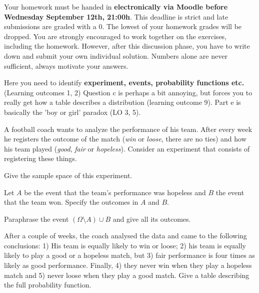 \documentclass[a4paper,10pt,landscape,twocolumn]{scrartcl}
\newcommand\deadline{Wednesday September 12th, 21:00h}
\begin{document}
\homeworkproblems

{\sffamily\noindent
Your homework must be handed in \textbf{electronically via Moodle before \deadline}. This deadline is strict and late submissions are graded with a 0. The lowest of your homework grades will be dropped. You are strongly encouraged to work together on the exercises, including the homework. However, after this discussion phase, you have to write down and submit your own individual solution. Numbers alone are never sufficient, always motivate your answers.
}



\begin{exercise}[Hospitals (4pt)]
	\begin{mycomment}
	Here you need to identify \textbf{experiment, events, probability functions etc.} (Learning outcomes 1, 2) Question c is perhaps a bit annoying, but forces you to really get how a table describes a distribution (learning outcome 9). Part e is basically the 'boy or girl' paradox (LO 3, 5). 
	\end{mycomment}
	
	 A football coach wants to analyze the performance of his team. After every week he registers the outcome of the match (\emph{win} or \emph{loose}, there are no ties) and how his team played (\emph{good}, \emph{fair} or \emph{hopeless}). Consider an experiment that consists of registering these things.
	
	\begin{subex}[0.5pt]
		Give the sample space of this experiment.	
	\end{subex}
	
	\begin{subex}[0.5pt]
		Let $A$ be the event that the team's performance was hopeless and $B$ the event that the team won. Specify the outcomes in $A$ and $B$.
	\end{subex}

	\begin{subex}[1pt]
		Paraphrase the event $(\Omega \setminus A) \cup B$ and give all its outcomes.	
	\end{subex}
	
	\begin{subex}[1pt]
	After a couple of weeks, the coach analysed the data and came to the following conclusions: 1) His team is equally likely to win or loose; 2) his team is equally likely to play a good or a hopeless match, but 3)  fair performance is four times as likely as good performance. Finally, 4) they never win when they play a hopeless match and 5) never loose when they play a good match. Give a table describing the full probability function.
	\end{subex}


\end{exercise}
\end{document}
